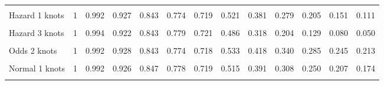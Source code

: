 \documentclass[
]{article}
\begin{document}
\begin{table}[H]
{\begin{tabular}[t]{lrrrrrrrrrrrr}
\cellcolor{gray!10}{Generalised Gamma} & \cellcolor{gray!10}{1} & \cellcolor{gray!10}{0.991} & \cellcolor{gray!10}{0.928} & \cellcolor{gray!10}{0.849} & \cellcolor{gray!10}{0.778} & \cellcolor{gray!10}{0.717} & \cellcolor{gray!10}{0.526} & \cellcolor{gray!10}{0.425} & \cellcolor{gray!10}{0.362} & \cellcolor{gray!10}{0.319} & \cellcolor{gray!10}{0.286} & \cellcolor{gray!10}{0.261}\\
Hazard 1 knots & 1 & 0.992 & 0.927 & 0.843 & 0.774 & 0.719 & 0.521 & 0.381 & 0.279 & 0.205 & 0.151 & 0.111\\
\cellcolor{gray!10}{Hazard 2 knots} & \cellcolor{gray!10}{1} & \cellcolor{gray!10}{0.992} & \cellcolor{gray!10}{0.928} & \cellcolor{gray!10}{0.843} & \cellcolor{gray!10}{0.774} & \cellcolor{gray!10}{0.719} & \cellcolor{gray!10}{0.523} & \cellcolor{gray!10}{0.384} & \cellcolor{gray!10}{0.284} & \cellcolor{gray!10}{0.210} & \cellcolor{gray!10}{0.156} & \cellcolor{gray!10}{0.116}\\
Hazard 3 knots & 1 & 0.994 & 0.922 & 0.843 & 0.779 & 0.721 & 0.486 & 0.318 & 0.204 & 0.129 & 0.080 & 0.050\\
\cellcolor{gray!10}{Odds 1 knots} & \cellcolor{gray!10}{1} & \cellcolor{gray!10}{0.992} & \cellcolor{gray!10}{0.927} & \cellcolor{gray!10}{0.843} & \cellcolor{gray!10}{0.774} & \cellcolor{gray!10}{0.718} & \cellcolor{gray!10}{0.532} & \cellcolor{gray!10}{0.415} & \cellcolor{gray!10}{0.338} & \cellcolor{gray!10}{0.283} & \cellcolor{gray!10}{0.242} & \cellcolor{gray!10}{0.211}\\
Odds 2 knots & 1 & 0.992 & 0.928 & 0.843 & 0.774 & 0.718 & 0.533 & 0.418 & 0.340 & 0.285 & 0.245 & 0.213\\
\cellcolor{gray!10}{Odds 3 knots} & \cellcolor{gray!10}{1} & \cellcolor{gray!10}{0.994} & \cellcolor{gray!10}{0.922} & \cellcolor{gray!10}{0.844} & \cellcolor{gray!10}{0.780} & \cellcolor{gray!10}{0.721} & \cellcolor{gray!10}{0.499} & \cellcolor{gray!10}{0.363} & \cellcolor{gray!10}{0.278} & \cellcolor{gray!10}{0.221} & \cellcolor{gray!10}{0.181} & \cellcolor{gray!10}{0.151}\\
Normal 1 knots & 1 & 0.992 & 0.926 & 0.847 & 0.778 & 0.719 & 0.515 & 0.391 & 0.308 & 0.250 & 0.207 & 0.174\\
\cellcolor{gray!10}{Normal 2 knots} & \cellcolor{gray!10}{1} & \cellcolor{gray!10}{0.992} & \cellcolor{gray!10}{0.929} & \cellcolor{gray!10}{0.843} & \cellcolor{gray!10}{0.773} & \cellcolor{gray!10}{0.718} & \cellcolor{gray!10}{0.537} & \cellcolor{gray!10}{0.425} & \cellcolor{gray!10}{0.349} & \cellcolor{gray!10}{0.293} & \cellcolor{gray!10}{0.251} & \cellcolor{gray!10}{0.219}\\

\end{tabular}}
\end{table}
\end{document}
